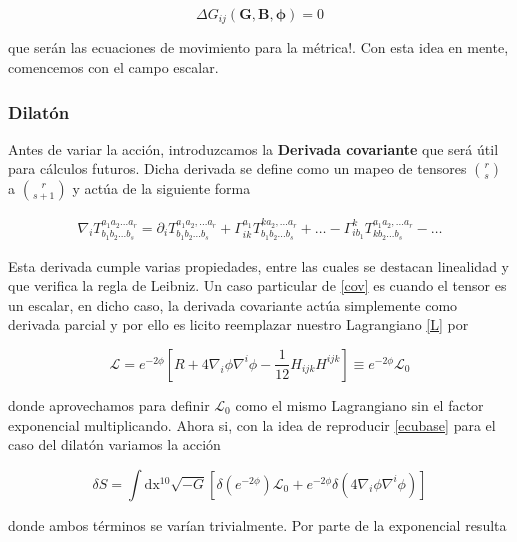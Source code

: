 \documentclass{article}
\numberwithin{equation}{section}
\begin{document}
\begin{equation*}
\Delta G_{ij}(\textbf{G},\textbf{B},\pmb{\phi}) =0
\end{equation*}

que serán las ecuaciones de movimiento para la métrica!. Con esta idea en mente, comencemos con el campo escalar.

\subsubsection{Dilatón}

Antes de variar la acción, introduzcamos la \textbf{Derivada covariante} que será útil para cálculos futuros. Dicha derivada se define como un mapeo de tensores $\binom{r}{s}$ a $ \binom{r}{s+1} $  y actúa de la siguiente forma


\begin{equation}\label{cov}
\begin{aligned}
\nabla_{i} T^{a_1a_2...a_r}_{b_1b_2...b_s} = \partial_i T^{a_1a_2,...a_r}_{b_1b_2...b_s}
+ \Gamma^{a_1}_{i k}T^{k a_2,...a_r}_{b_1 b_2...b_s} + \dots - \Gamma^{k}_{i b_1}T^{a_1 a_2,...a_r}_{k b_2...b_s} - \dots
\end{aligned}
\end{equation}

Esta derivada cumple varias propiedades, entre las cuales se destacan linealidad y que verifica la regla de Leibniz. Un caso particular de \ref{cov} es cuando el tensor es un escalar, en dicho caso, la derivada covariante actúa simplemente como derivada parcial y por ello es licito reemplazar nuestro Lagrangiano \ref{L} por

\begin{equation*}
\mathscr{L}= e^{-2\phi}\left[R + 4 \nabla_i \phi\nabla^i \phi - \frac{1}{12} H_{i j k}H^{i j k}\right] \equiv e^{-2\phi} \mathscr{L}_0
\end{equation*}

donde aprovechamos para definir $ \mathscr{L}_0 $ como el mismo Lagrangiano sin el factor exponencial multiplicando. Ahora si, con la idea de reproducir \ref{ecubase} para el caso del dilatón variamos la acción

\begin{equation*}
 \delta S = \int\mathrm{dx^{10}}\sqrt{-G} \left[ \delta \left(e^{-2\phi}\right) \mathscr{L}_0  + e^{-2\phi} \delta \left( 4 \nabla_{i}\phi\nabla^{i} \phi \right) \right]
\end{equation*}

donde ambos términos se varían trivialmente. Por parte de la exponencial resulta
\end{document}
